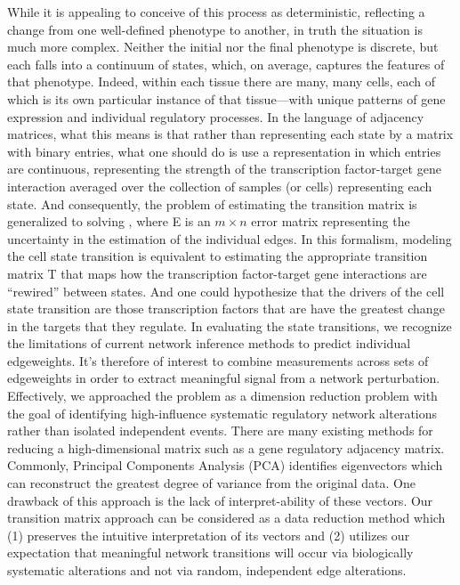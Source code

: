 \documentclass[english]{article}
\begin{document}
While it is appealing to conceive of this process as deterministic,
reflecting a change from one well-defined phenotype to another, in
truth the situation is much more complex. Neither the initial nor
the final phenotype is discrete, but each falls into a continuum of
states, which, on average, captures the features of that phenotype.
Indeed, within each tissue there are many, many cells, each of which
is its own particular instance of that tissue—with unique patterns
of gene expression and individual regulatory processes. In the language
of adjacency matrices, what this means is that rather than representing
each state by a matrix with binary entries, what one should do is
use a representation in which entries are continuous, representing
the strength of the transcription factor-target gene interaction averaged
over the collection of samples (or cells) representing each state.
And consequently, the problem of estimating the transition matrix
is generalized to solving , where E is an $m\times n$ error matrix
representing the uncertainty in the estimation of the individual edges.
In this formalism, modeling the cell state transition is equivalent
to estimating the appropriate transition matrix T that maps how the
transcription factor-target gene interactions are “rewired” between
states. And one could hypothesize that the drivers of the cell state
transition are those transcription factors that are have the greatest
change in the targets that they regulate. In evaluating the state
transitions, we recognize the limitations of current network inference
methods to predict individual edgeweights. It's therefore of interest
to combine measurements across sets of edgeweights in order to extract
meaningful signal from a network perturbation. Effectively, we approached
the problem as a dimension reduction problem with the goal of identifying
high-influence systematic regulatory network alterations rather than
isolated independent events. There are many existing methods for reducing
a high-dimensional matrix such as a gene regulatory adjacency matrix.
Commonly, Principal Components Analysis (PCA) identifies eigenvectors
which can reconstruct the greatest degree of variance from the original
data. One drawback of this approach is the lack of interpret-ability
of these vectors. Our transition matrix approach can be considered
as a data reduction method which (1) preserves the intuitive interpretation
of its vectors and (2) utilizes our expectation that meaningful network
transitions will occur via biologically systematic alterations and
not via random, independent edge alterations. 
\end{document}
